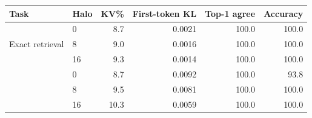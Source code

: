 \begin{tabular}{@{}llrrrr@{}}
\toprule
Task & Halo & KV\% & First-token KL & Top-1 agree & Accuracy \\
\midrule
\multirow{3}{*}{Exact retrieval} & 0 & 8.7 & 0.0021 & 100.0 & 100.0 \\
 & 8 & 9.0 & 0.0016 & 100.0 & 100.0 \\
 & 16 & 9.3 & 0.0014 & 100.0 & 100.0 \\
\addlinespace[1pt]
\multirow{3}{*}{Multi-hop} & 0 & 8.7 & 0.0092 & 100.0 & 93.8 \\
 & 8 & 9.5 & 0.0081 & 100.0 & 100.0 \\
 & 16 & 10.3 & 0.0059 & 100.0 & 100.0 \\
\bottomrule
\end{tabular}
